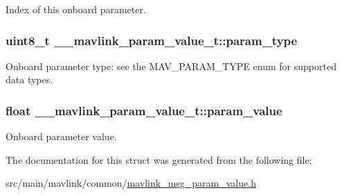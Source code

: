 Index of this onboard parameter. 

\hypertarget{struct____mavlink__param__value__t_a825cfefbe7cfd71991186c4ffc897447}{
\subsubsection[{param\+\_\+type}]{\setlength{\rightskip}{0pt plus 5cm}uint8\+\_\+t \+\_\+\+\_\+mavlink\+\_\+param\+\_\+value\+\_\+t\+::param\+\_\+type}}\label{struct____mavlink__param__value__t_a825cfefbe7cfd71991186c4ffc897447}


Onboard parameter type\+: see the M\+A\+V\+\_\+\+P\+A\+R\+A\+M\+\_\+\+T\+Y\+P\+E enum for supported data types. 

\hypertarget{struct____mavlink__param__value__t_acd7d6401383f92dac17a95946b501a50}{
\subsubsection[{param\+\_\+value}]{\setlength{\rightskip}{0pt plus 5cm}float \+\_\+\+\_\+mavlink\+\_\+param\+\_\+value\+\_\+t\+::param\+\_\+value}}\label{struct____mavlink__param__value__t_acd7d6401383f92dac17a95946b501a50}


Onboard parameter value. 



The documentation for this struct was generated from the following file\+:\begin{DoxyCompactItemize}
\item 
src/main/mavlink/common/\hyperlink{mavlink__msg__param__value_8h}{mavlink\+\_\+msg\+\_\+param\+\_\+value.\+h}\end{DoxyCompactItemize}
